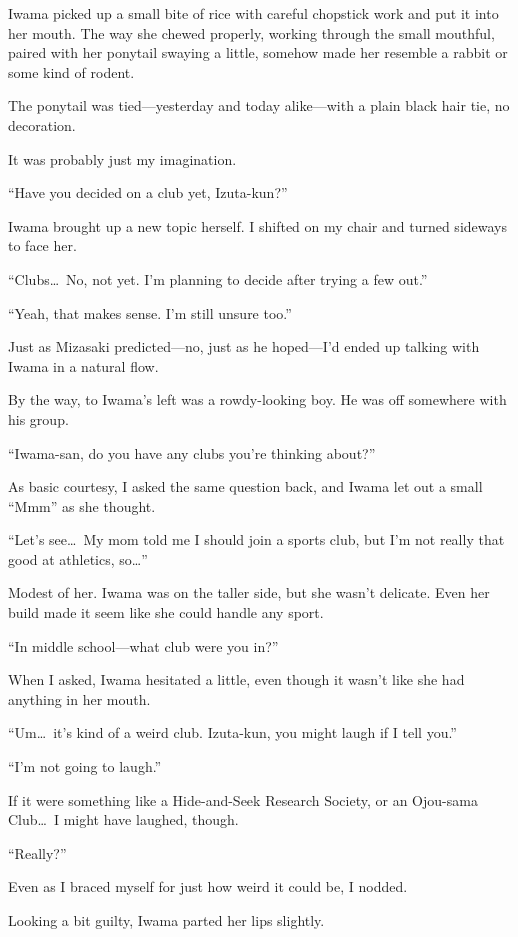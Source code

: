 \documentclass[
    a4paper,
    12pt,
    twoside,
    openany,
    UTF8,
    fontset=windows
]{ctexbook}
\begin{document}
Iwama picked up a small bite of rice with careful chopstick work and put it into her mouth. The way she chewed properly, working through the small mouthful, paired with her ponytail swaying a little, somehow made her resemble a rabbit or some kind of rodent.

The ponytail was tied---yesterday and today alike---with a plain black hair tie, no decoration.

It was probably just my imagination.

``Have you decided on a club yet, Izuta-kun?''

Iwama brought up a new topic herself. I shifted on my chair and turned sideways to face her.

``Clubs\dots\ No, not yet. I'm planning to decide after trying a few out.''

``Yeah, that makes sense. I'm still unsure too.''

Just as Mizasaki predicted---no, just as he hoped---I'd ended up talking with Iwama in a natural flow.

By the way, to Iwama's left was a rowdy-looking boy. He was off somewhere with his group.

``Iwama-san, do you have any clubs you're thinking about?''

As basic courtesy, I asked the same question back, and Iwama let out a small ``Mmm'' as she thought.

``Let's see\dots\ My mom told me I should join a sports club, but I'm not really that good at athletics, so\dots''

Modest of her. Iwama was on the taller side, but she wasn't delicate. Even her build made it seem like she could handle any sport.

``In middle school---what club were you in?''

When I asked, Iwama hesitated a little, even though it wasn't like she had anything in her mouth.

``Um\dots\ it's kind of a weird club. Izuta-kun, you might laugh if I tell you.''

``I'm not going to laugh.''

If it were something like a Hide-and-Seek Research Society, or an Ojou-sama Club\dots\ I might have laughed, though.

``Really?''

Even as I braced myself for just how weird it could be, I nodded.

Looking a bit guilty, Iwama parted her lips slightly.
\end{document}
